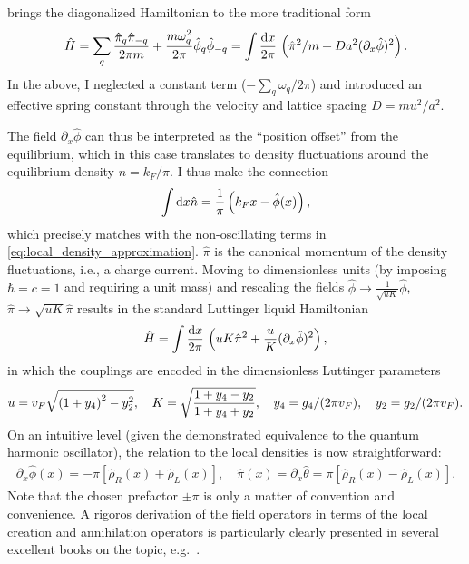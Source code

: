 brings the diagonalized Hamiltonian to the more traditional form
\begin{align}
    \hat H = \sum_q \frac{\hat\pi_q\hat\pi_{-q}}{2\pi m} + \frac{m\omega_q^2}{2\pi}\hat\phi_q\hat\phi_{-q}
    =
    \int\frac{\mathrm d x}{2\pi}\, \left( \hat\pi^2/m + {Da^2}(\partial_x\hat\phi)^2 \right).
\end{align}
In the above, I neglected a constant term ($-\sum_q\omega_q/2\pi$) and introduced an effective spring constant through the velocity and lattice spacing $D=mu^2/a^2$.

The field $\partial_x\hat\phi$ can thus be interpreted as the ``position offset'' from the equilibrium, which in this case translates to density fluctuations around the equilibrium density $n=k_F/\pi$.
I thus make the connection
\begin{align}
    \int\mathrm d x\hat n = \frac1\pi\left( k_Fx - \hat\phi(x) \right),
\end{align}
which precisely matches with the non-oscillating terms in \cref{eq:local_density_approximation}.
$\hat\pi$ is the canonical momentum of the density fluctuations, i.e., a charge current.
Moving to dimensionless units (by imposing $\hbar=c=1$ and requiring a unit mass) and rescaling the fields $\hat\phi\rightarrow \frac1{\sqrt{uK}}\hat\phi$, $\hat\pi\rightarrow \sqrt{uK}\hat\pi$ results in the standard Luttinger liquid Hamiltonian
\begin{align}
    \hat H = \int\frac{\mathrm d x}{2\pi}\, \left( uK\hat\pi^2 + \frac uK(\partial_x\hat\phi)^2 \right),
    \label{eq:ll_hamiltonian}
\end{align}
in which the couplings are encoded in the dimensionless Luttinger parameters
\begin{align}
    u = v_F\sqrt{\left( 1 + y_4 \right)^2 - y_2^2},
    \quad
    K = \sqrt{\frac{1+y_4-y_2}{1+y_4+y_2}},
    \quad
    y_4=g_4/(2\pi v_F),
    \quad
    y_2=g_2/(2\pi v_F).
\end{align}
On an intuitive level (given the demonstrated equivalence to the quantum harmonic oscillator), the relation to the local densities is now straightforward:
\begin{align}
    \partial_x\hat\phi(x)=-\pi[\hat\rho_R(x)+\hat\rho_L(x)],
    \quad
    \hat\pi(x)=\partial_x\hat\theta=\pi[\hat\rho_R(x)-\hat\rho_L(x)].
\end{align}
Note that the chosen prefactor $\pm\pi$ is only a matter of convention and convenience.
A rigoros derivation of the field operators in terms of the local creation and annihilation operators is particularly clearly presented in several excellent books on the topic, e.g.~\cite{Bruus2004,Giamarchi2003,Gogolin2004}.

